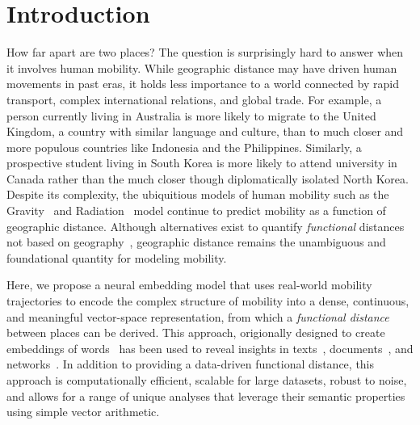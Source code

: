 \documentclass[12pt]{article} %
\begin{document}
%
%
\section{Introduction}\label{sec:introduction} %


How far apart are two places?
The question is surprisingly hard to answer when it involves human mobility.
While geographic distance may have driven human movements in past eras, it holds less importance to a world connected by rapid transport, complex international relations, and global trade.
For example, a person currently living in Australia is more likely to migrate to the United Kingdom, a country with similar language and culture, than to much closer and more populous countries like Indonesia and the Philippines. 
Similarly, a prospective student living in South Korea is more likely to attend university in Canada rather than the much closer though diplomatically isolated North Korea. 
Despite its complexity, the ubiquitious models of human mobility such as the Gravity~\autocite{zipf1946gravity} and Radiation~\autocite{simini2012universal} model continue to predict mobility as a function of geographic distance.
Although alternatives exist to quantify \textit{functional} distances not based on geography~\autocite{boschma2005proximity, brown1970functional, brown1970migration, kim2018functional}, geographic distance remains the unambiguous and foundational quantity for modeling mobility. 

Here, we propose a neural embedding model that uses real-world mobility trajectories to encode the complex structure of mobility into a dense, continuous, and meaningful vector-space representation, from which a \textit{functional distance} between places can be derived.
This approach, origionally designed to create embeddings of words~\autocite{mikolov2013word2vec} has been used to reveal insights in texts~\autocite{linzhuo2020hyperbolic, tshitoyan2019mat2vec, garg2018gender, kozlowski2018geometry, hamilton2016diachronic}, documents~\autocite{le2014doc2vec, nakandala2016twitch}, and networks~\autocite{perozzi2014deepwalk, grover2016node2vec}.
In addition to providing a data-driven functional distance, this approach is computationally efficient, scalable for large datasets, robust to noise, and allows for a range of unique analyses that leverage their semantic properties using simple vector arithmetic.
\end{document}

